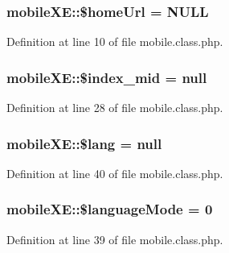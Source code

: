 \hypertarget{classmobileXE_abff078bb36c02394447e55be4500b762}{}
\subsubsection[{\$home\+Url}]{\setlength{\rightskip}{0pt plus 5cm}mobile\+X\+E\+::\$home\+Url = N\+U\+L\+L}\label{classmobileXE_abff078bb36c02394447e55be4500b762}


Definition at line 10 of file mobile.\+class.\+php.

\hypertarget{classmobileXE_a9e93ed38eed50085338e8128ab4015ab}{}
\subsubsection[{\$index\+\_\+mid}]{\setlength{\rightskip}{0pt plus 5cm}mobile\+X\+E\+::\$index\+\_\+mid = null}\label{classmobileXE_a9e93ed38eed50085338e8128ab4015ab}


Definition at line 28 of file mobile.\+class.\+php.

\hypertarget{classmobileXE_a126d781fe75edb57ef2718f5a6e26d82}{}
\subsubsection[{\$lang}]{\setlength{\rightskip}{0pt plus 5cm}mobile\+X\+E\+::\$lang = null}\label{classmobileXE_a126d781fe75edb57ef2718f5a6e26d82}


Definition at line 40 of file mobile.\+class.\+php.

\hypertarget{classmobileXE_a70ee01279ea1bcdd609905e80e4544b7}{}
\subsubsection[{\$language\+Mode}]{\setlength{\rightskip}{0pt plus 5cm}mobile\+X\+E\+::\$language\+Mode = 0}\label{classmobileXE_a70ee01279ea1bcdd609905e80e4544b7}


Definition at line 39 of file mobile.\+class.\+php.

\hypertarget{classmobileXE_abd07e5909154b43a31e2ebff5d51e4c7}{}
